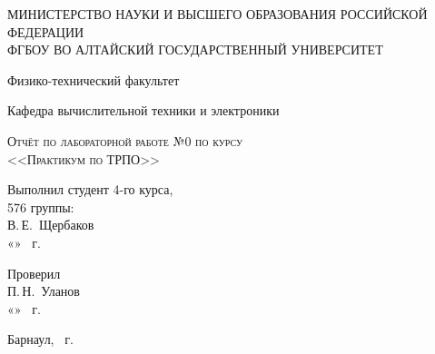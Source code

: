 \documentclass[a4paper,14pt]{extarticle}
\begin{document}
\begin{titlepage}
  \begin{center}
    \MakeUppercase{Министерство науки и высшего образования Российской Федерации} \\
    \MakeUppercase{ФГБОУ ВО Алтайский государственный университет}
    \vspace{0.25cm}
    
    Физико-технический факультет
    
    Кафедра вычислительной техники и электроники
    \vfill
    
    \textsc{Отчёт по лабораторной работе №0 по курсу \\ <<Практикум по ТРПО>>}
  \bigskip

\end{center}
\vfill

\newlength{\ML}
\hfill\begin{minipage}{0.5\textwidth}
  Выполнил студент 4-го курса, \\ 576 группы:\\
  \underline{\hspace{\ML}} В.\,Е.~Щербаков\\
  «\underline{\hspace{0.7cm}}» \underline{\hspace{2cm}} \the\year~г.
\end{minipage}%
\bigskip

\hfill\begin{minipage}{0.5\textwidth}
  Проверил\\
  \underline{\hspace{\ML}} П.\,Н.~Уланов\\
  «\underline{\hspace{0.7cm}}» \underline{\hspace{2cm}} \the\year~г.
\end{minipage}%
\vfill

\begin{center}
  Барнаул, \the\year~г.
\end{center}
\end{titlepage}

\tableofcontents

\newpage
\end{document}
